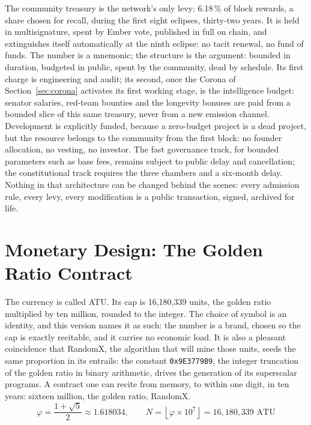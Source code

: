 The community treasury is the network's only levy: 6.18\,\% of block
rewards, a share chosen for recall, during the first eight eclipses,
thirty-two years. It is held in multisignature, spent by Ember vote,
published in full on chain, and extinguishes itself automatically at the
ninth eclipse: no tacit renewal, no fund of funds. The number is a
mnemonic; the structure is the argument: bounded in duration, budgeted in
public, spent by the community, dead by schedule. Its first charge is
engineering and audit; its second, once the Corona of
Section~\ref{sec:corona} activates its first working stage, is the
intelligence budget: senator salaries, red-team bounties and the
longevity bonuses are paid from a bounded slice of this same treasury,
never from a new emission channel. Development is explicitly funded,
because a zero-budget project is a dead project, but the resource belongs
to the community from the first block: no founder allocation, no
vesting, no investor. The fast governance track, for bounded parameters
such as base fees, remains subject to public delay and cancellation; the
constitutional track requires the three chambers and a six-month delay.
Nothing in that architecture can be changed behind the scenes: every
admission rule, every levy, every modification is a public transaction,
signed, archived for life.

\section{Monetary Design: The Golden Ratio Contract}\label{sec:economy}

The currency is called ATU. Its cap is 16,180,339 units, the golden
ratio multiplied by ten million, rounded to the integer. The choice of
symbol is an identity, and this version names it as such: the number is
a brand, chosen so the cap is exactly recitable, and it carries no
economic load. It is also a pleasant coincidence that RandomX, the
algorithm that will mine those units, seeds the same proportion in its
entrails: the constant \texttt{0x9E3779B9}, the integer truncation of the
golden ratio in binary arithmetic, drives the generation of its
superscalar programs. A contract one can recite from memory, to within
one digit, in ten years: sixteen million, the golden ratio, RandomX.
\begin{equation}\label{eq:phi}
\varphi = \frac{1 + \sqrt{5}}{2} \approx 1.618034,
\qquad
N = \left\lfloor \varphi \times 10^{7} \right\rfloor = 16{,}180{,}339 \text{ ATU}
\end{equation}

